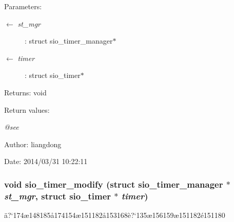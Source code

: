 \begin{Desc}
\item[Parameters:]
\begin{description}
\item[\mbox{$\leftarrow$} {\em st\_\-mgr}]: struct sio\_\-timer\_\-manager$\ast$ \item[\mbox{$\leftarrow$} {\em timer}]: struct sio\_\-timer$\ast$ \end{description}
\end{Desc}
\begin{Desc}
\item[Returns:]void \end{Desc}
\begin{Desc}
\item[Return values:]
\begin{description}
\item[{\em @see}]\end{description}
\end{Desc}
\begin{Desc}
\item[Author:]liangdong \end{Desc}
\begin{Desc}
\item[Date:]2014/03/31 10:22:11 \end{Desc}
\subsubsection{\setlength{\rightskip}{0pt plus 5cm}void sio\_\-timer\_\-modify (struct sio\_\-timer\_\-manager $\ast$ {\em st\_\-mgr}, struct sio\_\-timer $\ast$ {\em timer})}\label{sio__timer_8h_a6}


\"{a}?`174\ae{}148185\aa{}174154\ae{}151182\aa{}153168\`{e}?`135\ae{}156159\ae{}151182\'{e}151180 

